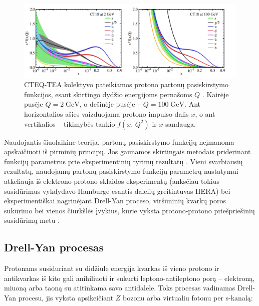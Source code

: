 \documentclass[a4paper, 12pt, oneside]{article}
\begin{document}
\begin{figure}[t]
	\includegraphics[width=\linewidth]{CT18_PDF.png}
	\caption{\label{fig:PDFs}
		CTEQ-TEA kolektyvo pateikiamos protono partonų pasiskirstymo funkcijos, esant skirtingo dydžio energijoms pernašoms $Q$ \cite{CTEQ2019}.
		Kairėje pusėje $Q=2 \; \mathrm{GeV}$, o dešinėje pusėje -- $Q=100 \; \mathrm{GeV}$.
		Ant horizontalios ašies vaizduojama protono impulso dalis $x$, o ant vertikalios -- tikimybės tankio $f(x,\, Q^2)$
		ir $x$ sandauga.}
\end{figure}

Naudojantis šiuolaikine teorija, partonų pasiskirstymo funkcijų neįmanoma apskaičiuoti iš pirminių principų.
Jos gaunamos skirtingais metodais priderinant funkcijų parametrus prie eksperimentinių tyrimų rezultatų
\cite{PDF_MMHT2015, PDF_CJ15, NNPDF, PDF_ABMP16, PDF_MMHT2019, CTEQ2019}.
Vieni svarbiausių rezultatų, naudojamų partonų pasiskirstymo funkcijų parametrų nustatymui atkeliauja iš elektrono-protono
sklaidos eksperimentų (anksčiau tokius susidūrimus vykdydavo Hamburge esantis dalelių greitintuvas HERA) bei eksperimentiškai nagrinėjant
Drell-Yan proceso, viršūninių kvarkų poros sukūrimo bei vienos čiurkšlės įvykius, kurie vyksta protono-protono priešpriešinių susidūrimų
metu \cite{CTEQ2019}.


\subsection{Drell-Yan procesas}
Protonams susiduriant su didžiule energija kvarkas iš vieno protono ir antikvarkas iš kito gali anihiliuoti ir sukurti leptono-antileptono
porą -- elektroną, miuoną arba taoną su atitinkama savo antidalele.
Toks procesas vadinamas Drell-Yan procesu, jis vyksta apsikeičiant $Z$ bozonu arba virtualiu fotonu per s-kanalą:
\end{document}

